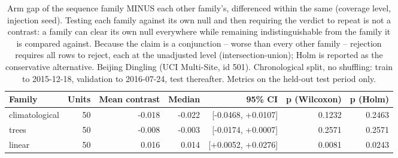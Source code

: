 \begin{table}[htbp]
\caption{Arm gap of the sequence family MINUS each other family's, differenced within the same (coverage level, injection seed). Testing each family against its own null and then requiring the verdict to repeat is not a contrast: a family can clear its own null everywhere while remaining indistinguishable from the family it is compared against. Because the claim is a conjunction -- worse than every other family -- rejection requires all rows to reject, each at the unadjusted level (intersection-union); Holm is reported as the conservative alternative. Beijing Dingling (UCI Multi-Site, id 501). Chronological split, no shuffling: train to 2015-12-18, validation to 2016-07-24, test thereafter. Metrics on the held-out test period only.}
\label{tab:ablation_family_contrasts}
\begin{tabular}{lrrrrrr}
\toprule
Family & Units & Mean contrast & Median & 95\% CI & p (Wilcoxon) & p (Holm) \\
\midrule
climatological & 50 & -0.018 & -0.022 & [-0.0468, +0.0107] & 0.1232 & 0.2463 \\
trees & 50 & -0.008 & -0.003 & [-0.0174, +0.0007] & 0.2571 & 0.2571 \\
linear & 50 & 0.016 & 0.014 & [+0.0052, +0.0276] & 0.0081 & 0.0243 \\
\bottomrule
\end{tabular}
\end{table}
